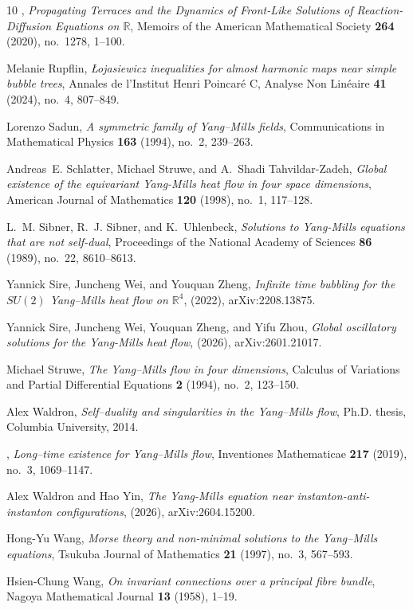 \documentclass[11pt,a4paper]{article}
\numberwithin{equation}{section}
\theoremstyle{plain}
\theoremstyle{remark}
\begin{document}
\begin{thebibliography}{10}
\bysame, \emph{{Propagating Terraces and the Dynamics of Front-Like Solutions of Reaction-Diffusion Equations on $\mathbb{R}$}}, Memoirs of the American Mathematical Society \textbf{264} (2020), no.~1278, 1--100.

Melanie Rupflin, \emph{{\L}ojasiewicz inequalities for almost harmonic maps near simple bubble trees}, Annales de l'Institut Henri Poincar{\'e} C, Analyse Non Lin{\'e}aire \textbf{41} (2024), no.~4, 807--849.

Lorenzo Sadun, \emph{A symmetric family of {Yang--Mills} fields}, Communications in Mathematical Physics \textbf{163} (1994), no.~2, 239--263.

Andreas~E. Schlatter, Michael Struwe, and A.~Shadi Tahvildar-Zadeh, \emph{Global existence of the equivariant {Yang-Mills} heat flow in four space dimensions}, American Journal of Mathematics \textbf{120} (1998), no.~1, 117--128.

L.~M. Sibner, R.~J. Sibner, and K.~Uhlenbeck, \emph{Solutions to {Yang-Mills} equations that are not self-dual}, Proceedings of the National Academy of Sciences \textbf{86} (1989), no.~22, 8610--8613.

Yannick Sire, Juncheng Wei, and Youquan Zheng, \emph{Infinite time bubbling for the {$SU(2)$ Yang--Mills} heat flow on $\mathbb{R}^4$},  (2022), arXiv:2208.13875.

Yannick Sire, Juncheng Wei, Youquan Zheng, and Yifu Zhou, \emph{Global oscillatory solutions for the {Yang-Mills} heat flow},  (2026), arXiv:2601.21017.

Michael Struwe, \emph{The {Yang--Mills} flow in four dimensions}, Calculus of Variations and Partial Differential Equations \textbf{2} (1994), no.~2, 123--150.

Alex Waldron, \emph{Self--duality and singularities in the {Yang--Mills} flow}, Ph.D. thesis, Columbia University, 2014.

\bysame, \emph{Long–time existence for {Yang--Mills} flow}, Inventiones Mathematicae \textbf{217} (2019), no.~3, 1069--1147.

Alex Waldron and Hao Yin, \emph{The {Yang-Mills} equation near instanton-anti-instanton configurations},  (2026), arXiv:2604.15200.

Hong-Yu Wang, \emph{{Morse} theory and non-minimal solutions to the {Yang–Mills} equations}, Tsukuba Journal of Mathematics \textbf{21} (1997), no.~3, 567--593.

Hsien-Chung Wang, \emph{On invariant connections over a principal fibre bundle}, Nagoya Mathematical Journal \textbf{13} (1958), 1--19.

\end{thebibliography}
\end{document}
